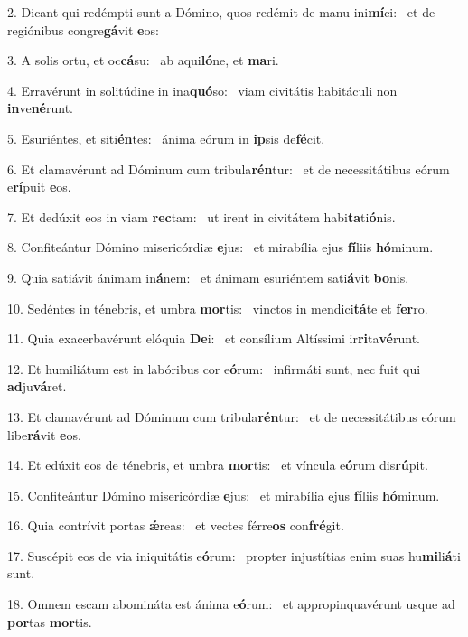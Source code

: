 2. Dicant qui redémpti sunt a Dómino, quos redémit de manu ini\textbf{mí}ci: \ast\  et de regiónibus congre\textbf{gá}vit \textbf{e}os:\

3. A solis ortu, et oc\textbf{cá}su: \ast\  ab aqui\textbf{ló}ne, et \textbf{ma}ri.\

4. Erravérunt in solitúdine in ina\textbf{quó}so: \ast\  viam civitátis habitáculi non \textbf{in}ve\textbf{né}runt.\

5. Esuriéntes, et siti\textbf{én}tes: \ast\  ánima eórum in \textbf{ip}sis de\textbf{fé}cit.\

6. Et clamavérunt ad Dóminum cum tribula\textbf{rén}tur: \ast\  et de necessitátibus eórum e\textbf{rí}puit \textbf{e}os.\

7. Et dedúxit eos in viam \textbf{rec}tam: \ast\  ut irent in civitátem habi\textbf{ta}ti\textbf{ó}nis.\

8. Confiteántur Dómino misericórdiæ \textbf{e}jus: \ast\  et mirabília ejus \textbf{fí}liis \textbf{hó}minum.\

9. Quia satiávit ánimam in\textbf{á}nem: \ast\  et ánimam esuriéntem sati\textbf{á}vit \textbf{bo}nis.\

10. Sedéntes in ténebris, et umbra \textbf{mor}tis: \ast\  vinctos in mendici\textbf{tá}te et \textbf{fer}ro.\

11. Quia exacerbavérunt elóquia \textbf{De}i: \ast\  et consílium Altíssimi ir\textbf{ri}ta\textbf{vé}runt.\

12. Et humiliátum est in labóribus cor e\textbf{ó}rum: \ast\  infirmáti sunt, nec fuit qui \textbf{ad}ju\textbf{vá}ret.\

13. Et clamavérunt ad Dóminum cum tribula\textbf{rén}tur: \ast\  et de necessitátibus eórum libe\textbf{rá}vit \textbf{e}os.\

14. Et edúxit eos de ténebris, et umbra \textbf{mor}tis: \ast\  et víncula e\textbf{ó}rum dis\textbf{rú}pit.\

15. Confiteántur Dómino misericórdiæ \textbf{e}jus: \ast\  et mirabília ejus \textbf{fí}liis \textbf{hó}minum.\

16. Quia contrívit portas \textbf{ǽ}reas: \ast\  et vectes férre\textbf{os} con\textbf{fré}git.\

17. Suscépit eos de via iniquitátis e\textbf{ó}rum: \ast\  propter injustítias enim suas hu\textbf{mi}li\textbf{á}ti sunt.\

18. Omnem escam abomináta est ánima e\textbf{ó}rum: \ast\  et appropinquavérunt usque ad \textbf{por}tas \textbf{mor}tis.\

